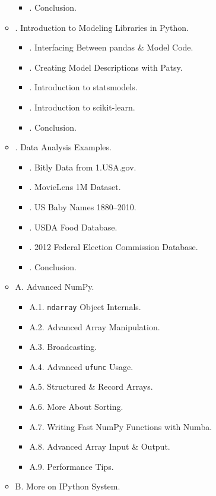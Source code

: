 \documentclass{article}
\begin{document}
\begin{enumerate}
\begin{itemize}
\begin{itemize}
			\item {. Conclusion.}
		\end{itemize}
		\item {. Introduction to Modeling Libraries in Python.}
		\begin{itemize}
			\item {. Interfacing Between pandas \& Model Code.}
			\item {. Creating Model Descriptions with Patsy.}
			\item {. Introduction to statsmodels.}
			\item {. Introduction to scikit-learn.}
			\item {. Conclusion.}
		\end{itemize}
		\item {. Data Analysis Examples.}
		\begin{itemize}
			\item {. Bitly Data from 1.USA.gov.}
			\item {. MovieLens 1M Dataset.}
			\item {. US Baby Names 1880--2010.}
			\item {. USDA Food Database.}
			\item {. 2012 Federal Election Commission Database.}
			\item {. Conclusion.}
		\end{itemize}
		\item {\sf A. Advanced NumPy.}
		\begin{itemize}
			\item {\sf A.1. {\tt ndarray} Object Internals.}
			\item {\sf A.2. Advanced Array Manipulation.}
			\item {\sf A.3. Broadcasting.}
			\item {\sf A.4. Advanced {\tt ufunc} Usage.}
			\item {\sf A.5. Structured \& Record Arrays.}
			\item {\sf A.6. More About Sorting.}
			\item {\sf A.7. Writing Fast NumPy Functions with Numba.}
			\item {\sf A.8. Advanced Array Input \& Output.}
			\item {\sf A.9. Performance Tips.}
		\end{itemize}
		\item {\sf B. More on IPython System.}
		\begin{itemize}

\end{itemize}
\end{itemize}
\end{enumerate}
\end{document}
